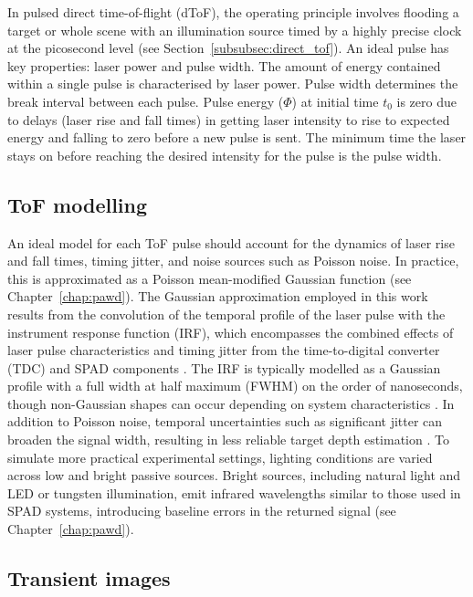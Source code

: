 \documentclass[12pt,a4paper,oneside]{report}
\begin{document}
In pulsed direct time-of-flight (dToF), the operating principle involves flooding a target or whole scene with an illumination source timed by a highly precise clock at the picosecond level (see Section~\ref{subsubsec:direct_tof}). An ideal pulse has key properties: laser power and pulse width. The amount of energy contained within a single pulse is characterised by laser power. Pulse width determines the break interval between each pulse. Pulse energy ($\Phi$) at initial time $t_0$ is zero due to delays (laser rise and fall times) in getting laser intensity to rise to expected energy and falling to zero before a new pulse is sent. The minimum time the laser stays on before reaching the desired intensity for the pulse is the pulse width.

\subsection{ToF modelling}
\label{subsec:tof_modelling}

An ideal model for each ToF pulse should account for the dynamics of laser rise and fall times, timing jitter, and noise sources such as Poisson noise. In practice, this is approximated as a Poisson mean-modified Gaussian function \cite{tontini2020,koerner2021} (see Chapter~\ref{chap:pawd}). The Gaussian approximation employed in this work results from the convolution of the temporal profile of the laser pulse with the instrument response function (IRF), which encompasses the combined effects of laser pulse characteristics and timing jitter from the time-to-digital converter (TDC) and SPAD components \cite{tontini2020}. The IRF is typically modelled as a Gaussian profile with a full width at half maximum (FWHM) on the order of nanoseconds, though non-Gaussian shapes can occur depending on system characteristics \cite{tontini2020}. In addition to Poisson noise, temporal uncertainties such as significant jitter can broaden the signal width, resulting in less reliable target depth estimation \cite{koerner2021}. To simulate more practical experimental settings, lighting conditions are varied across low and bright passive sources. Bright sources, including natural light and LED or tungsten illumination, emit infrared wavelengths similar to those used in SPAD systems, introducing baseline errors in the returned signal (see Chapter~\ref{chap:pawd}).

\subsection{Transient images}
\label{subsec:transient_images}
\end{document}

